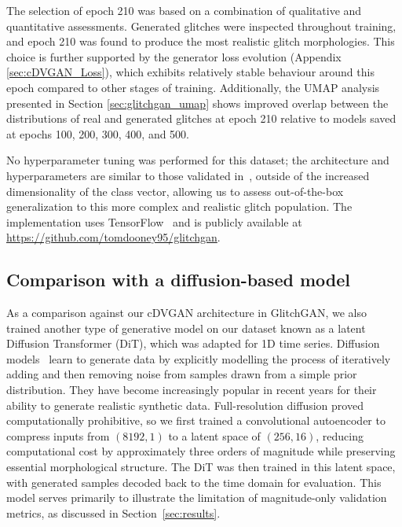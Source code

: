 \documentclass[reprint,nofootinbib,amsmath,amssymb,aps,floatfix]{revtex4-2}
\begin{document}

The selection of epoch 210 was based on a combination of qualitative and quantitative assessments. Generated glitches were inspected throughout training, and epoch 210 was found to produce the most realistic glitch morphologies. This choice is further supported by the generator loss evolution (Appendix \ref{sec:cDVGAN_Loss}), which exhibits relatively stable behaviour around this epoch compared to other stages of training. Additionally, the UMAP analysis presented in Section \ref{sec:glitchgan_umap} shows improved overlap between the distributions of real and generated glitches at epoch 210 relative to models saved at epochs 100, 200, 300, 400, and 500.
 
No hyperparameter tuning was performed for this dataset; the architecture and hyperparameters are similar to those validated in~\cite{cdvgan}, outside of the increased dimensionality of the class vector, allowing us to assess out-of-the-box generalization to this more complex and realistic glitch population.
The implementation uses TensorFlow~\cite{tensorflow2015-whitepaper} and is publicly available at \url{https://github.com/tomdooney95/glitchgan}.

\subsection{Comparison with a diffusion-based model}

As a comparison against our cDVGAN architecture in GlitchGAN, we also trained another type of generative model on our dataset known as a latent Diffusion Transformer (DiT), which was adapted for 1D time series.
Diffusion models~\cite{Ho2020DDPM, diffusionOriginal, ho2022classifierfree} learn to generate data by explicitly modelling the process of iteratively adding and then removing noise from samples drawn from a simple prior distribution.
They have become increasingly popular in recent years for their ability to generate realistic synthetic data.
Full-resolution diffusion proved computationally prohibitive, so we first trained a convolutional autoencoder to compress inputs from $(8192,1)$ to a latent space of $(256,16)$, reducing computational cost by approximately three orders of magnitude while preserving essential morphological structure.
The DiT was then trained in this latent space, with generated samples decoded back to the time domain for evaluation.
This model serves primarily to illustrate the limitation of magnitude-only validation metrics, as discussed in Section~\ref{sec:results}.
\end{document}
